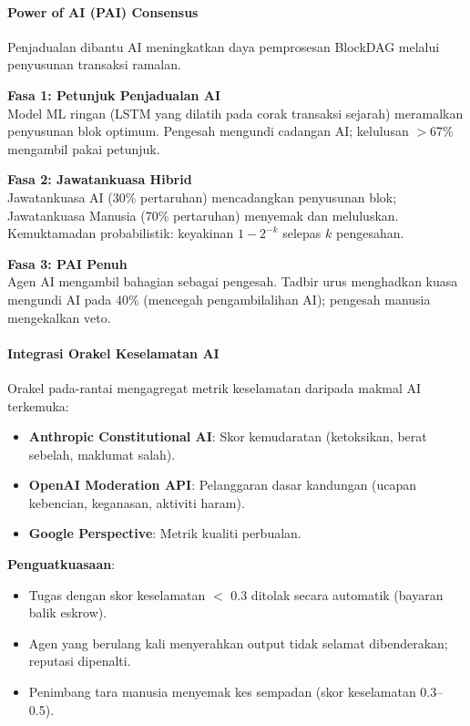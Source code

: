 \documentclass[11pt]{article}
\begin{document}
\paragraph{Power of AI (PAI) Consensus}
Penjadualan dibantu AI meningkatkan daya pemprosesan BlockDAG melalui penyusunan transaksi ramalan.

\textbf{Fasa 1: Petunjuk Penjadualan AI}\\
Model ML ringan (LSTM yang dilatih pada corak transaksi sejarah) meramalkan penyusunan blok optimum. Pengesah mengundi cadangan AI; kelulusan $>$67\% mengambil pakai petunjuk.

\textbf{Fasa 2: Jawatankuasa Hibrid}\\
Jawatankuasa AI (30\% pertaruhan) mencadangkan penyusunan blok; Jawatankuasa Manusia (70\% pertaruhan) menyemak dan meluluskan. Kemuktamadan probabilistik: keyakinan $1 - 2^{-k}$ selepas $k$ pengesahan.

\textbf{Fasa 3: PAI Penuh}\\
Agen AI mengambil bahagian sebagai pengesah. Tadbir urus menghadkan kuasa mengundi AI pada 40\% (mencegah pengambilalihan AI); pengesah manusia mengekalkan veto.

\paragraph{Integrasi Orakel Keselamatan AI}
Orakel pada-rantai mengagregat metrik keselamatan daripada makmal AI terkemuka:
\begin{itemize}[noitemsep]
  \item \textbf{Anthropic Constitutional AI}: Skor kemudaratan (ketoksikan, berat sebelah, maklumat salah).
  \item \textbf{OpenAI Moderation API}: Pelanggaran dasar kandungan (ucapan kebencian, keganasan, aktiviti haram).
  \item \textbf{Google Perspective}: Metrik kualiti perbualan.
\end{itemize}

\textbf{Penguatkuasaan}:
\begin{itemize}[noitemsep]
  \item Tugas dengan skor keselamatan $<$ 0.3 ditolak secara automatik (bayaran balik eskrow).
  \item Agen yang berulang kali menyerahkan output tidak selamat dibenderakan; reputasi dipenalti.
  \item Penimbang tara manusia menyemak kes sempadan (skor keselamatan 0.3--0.5).
\end{itemize}
\end{document}
